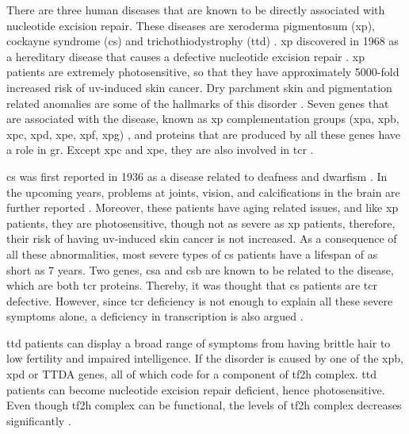 There are three human diseases that are known to be directly associated with nucleotide excision repair. These diseases are xeroderma pigmentosum (\gls{xp}), cockayne syndrome (\gls{cs}) and trichothiodystrophy (\gls{ttd}) \citep{de2000nucleotide,lehmann2003dna}. 
\gls{xp} discovered in 1968 as a hereditary disease that causes a defective nucleotide excision repair \citep{cleaver1968defective}. \gls{xp} patients are extremely photosensitive, so that they have approximately 5000-fold increased risk of \gls{uv}-induced skin cancer. Dry parchment skin and pigmentation related anomalies are some of the hallmarks of this disorder \citep{de2000nucleotide}.  Seven genes that are associated with the disease, known as \gls{xp} complementation groups (\gls{xpa}, \gls{xpb}, \gls{xpc}, \gls{xpd}, \gls{xpe}, \gls{xpf}, \gls{xpg}) \citep{cleaver1975xeroderma}, and proteins that are produced by all these genes have a role in \gls{gr}. Except \gls{xpc} and \gls{xpe}, they are also involved in \gls{tcr} \citep{van1995transcription}.  

\gls{cs} was first reported in 1936 as a disease related to deafness and dwarfism \citep{cockayne1936dwarfism}. In the upcoming years, problems at joints, vision, and calcifications in the brain are further reported \citep{cockayne1946dwarfism,neill1950syndrome}. Moreover, these patients have aging related issues, and like \gls{xp} patients, they are photosensitive, though not as severe as \gls{xp} patients, therefore, their risk of having \gls{uv}-induced skin cancer is not increased. As a consequence of all these abnormalities, most severe types of \gls{cs} patients have a lifespan of as short as 7 years. Two genes, \gls{csa} and \gls{csb} are known to be related to the disease, which are both \gls{tcr} proteins. Thereby, it was thought that \gls{cs} patients are \gls{tcr} defective. However, since \gls{tcr} deficiency is not enough to explain all these severe symptoms alone, a deficiency in transcription is also argued \citep{drapkin1994dual}.

\gls{ttd} patients can display a broad range of symptoms from having brittle hair to low fertility and impaired intelligence. If the disorder is caused by one of the \gls{xpb}, \gls{xpd} or TTDA genes, all of which code for a component of \gls{tf2h} complex. \gls{ttd} patients can become nucleotide excision repair deficient, hence photosensitive. Even though \gls{tf2h} complex can be functional, the levels of \gls{tf2h} complex decreases significantly \citep{giglia2006dynamic}.

